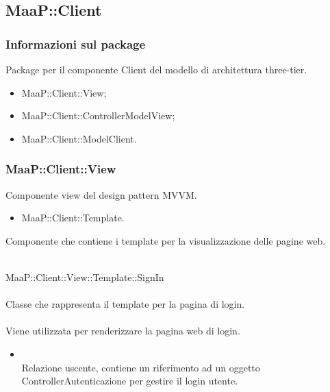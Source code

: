 \subsection{MaaP::Client}
\subsubsection{Informazioni sul package}
Package per il componente Client del modello di architettura three-tier.
\begin{itemize}
\item MaaP::Client::View;
\item MaaP::Client::ControllerModelView;
\item MaaP::Client::ModelClient.
\end{itemize}

\subsubsection{MaaP::Client::View}
Componente view del design pattern MVVM.
\begin{itemize}
\item MaaP::Client::Template.
\end{itemize}

Componente che contiene i template per la visualizzazione delle pagine web.

	\\
	MaaP::Client::View::Template::SignIn\\
	\\
	Classe che rappresenta il template per la pagina di login.\\
	\\
	Viene utilizzata per renderizzare la pagina web di login.\\
	\begin{itemize}
	\item{}\\
	Relazione uscente, contiene un riferimento ad un oggetto ControllerAutenticazione per gestire il login utente.
	\end{itemize}
	
